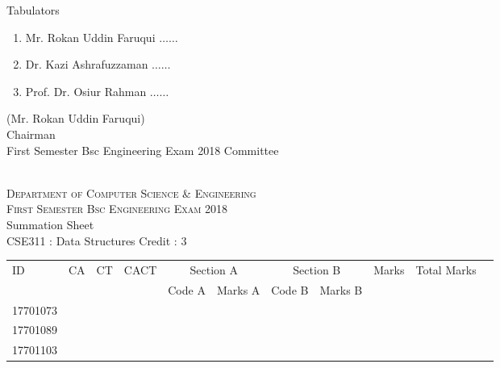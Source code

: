 \documentclass[12pt]{article}
\begin{document}
            \begin{table}[hb]
            	\centering
            \begin{minipage}[b]{0.5\linewidth} %
            {\centering Tabulators }
            \begin{enumerate}
                \item Mr. Rokan Uddin Faruqui \hspace*{1ex} $\ldots \ldots  $  
                \item Dr. Kazi Ashrafuzzaman \hspace*{1ex} $\ldots \ldots  $  
                \item Prof. Dr. Osiur Rahman \hspace*{1ex} $\ldots \ldots $  
            \end{enumerate} 

            \end{minipage}
            \hspace*{1.2cm}
            \begin{minipage}[b]{0.4\linewidth} \centering
            (Mr. Rokan Uddin Faruqui) \\
            Chairman  \hspace*{1ex} \\
           First Semester Bsc Engineering Exam 2018 Committee
            \end{minipage}
            \end{table}
            \clearpage
    \centering
    \begin{minipage}[m]{.8\textwidth} \centering 
	\smallskip
	\\
	\textsc{Department of Computer Science \& Engineering}\\
	\textsc{ First Semester Bsc Engineering Exam 2018}\\
    {\large {\sc Summation Sheet}}\\  
     {\centering CSE311 : Data Structures     Credit : 3 } \\
    \end{minipage} 
    \begin{center} 
	\renewcommand{\arraystretch}{1.08}
	\begin{small}
    \begin{tabular}{|l|c|c|c|c|c|c|c|c|c|c|} \hline
	\multirow{2}{*}{ID} & 	\multirow{2}{*}{CA}  & 	\multirow{2}{*}{CT}  & 	\multirow{2}{*}{CACT}  & \multicolumn{2 }{c|}{Section A}& \multicolumn{2 }{c|}{Section B} & 	\multirow{2}{*}{Marks}  & 	\multirow{2}{*}{Total Marks}  \\ 
	&  &  &  & Code A & Marks A & Code B & Marks B&  &  \\ \hline
17701073 &  &  &  &  &  &  &  &  & \\ \hline 
17701089 &  &  &  &  &  &  &  &  & \\ \hline 
17701103 &  &  &  &  &  &  &  &  & \\ \hline 
        \end{tabular}
            \end{small}
            \end{center}
  \centering
            
\end{document}
